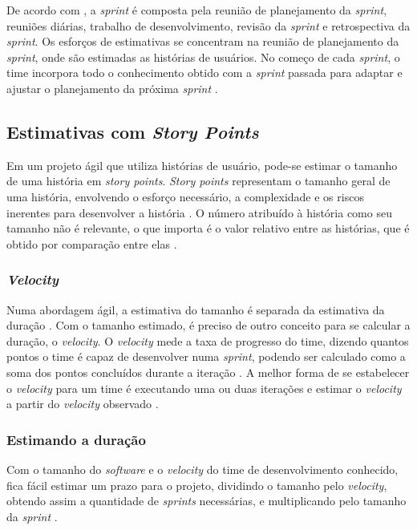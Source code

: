     De acordo com , a
    \textit{sprint} é composta pela reunião de planejamento da \textit{sprint}, reuniões diárias, trabalho de desenvolvimento,
    revisão da \textit{sprint} e retrospectiva da \textit{sprint}. Os esforços de estimativas se concentram na reunião de
    planejamento da \textit{sprint}, onde são estimadas as histórias de usuários. No começo de cada \textit{sprint}, o time
    incorpora todo o conhecimento obtido com a \textit{sprint} passada para adaptar e ajustar o planejamento da próxima
    \textit{sprint} \cite{cohn06}.

  \subsection{Estimativas com \textit{Story Points}}

    Em um projeto ágil
    que utiliza histórias de usuário, pode-se estimar o tamanho de uma história em \textit{story points}.
    \textit{Story points} representam o tamanho geral de uma história, envolvendo o esforço necessário, a complexidade e os
    riscos inerentes para desenvolver a história \cite{cohn06}. O número atribuído à história como seu tamanho não é relevante,
    o que importa é o valor relativo entre as histórias, que é obtido por comparação entre elas \cite{cohn06}.

      \subsubsection{\textit{Velocity}}

	Numa abordagem ágil, a estimativa do tamanho é separada da estimativa da duração \cite{cohn06}.
	Com o tamanho estimado, é preciso de outro conceito para se calcular a duração, o \textit{velocity}.
	O \textit{velocity} mede a taxa de progresso do time, dizendo quantos pontos o time é capaz de desenvolver
	numa \textit{sprint}, podendo ser calculado como a soma dos pontos concluídos durante a iteração \cite{cohn06}.
	A melhor forma de se estabelecer o \textit{velocity} para um time é executando uma ou duas iterações e estimar o
	\textit{velocity} a partir do \textit{velocity} observado \cite{cohn06}.

      \subsubsection{Estimando a duração}

	Com o tamanho do \textit{software} e o \textit{velocity} do time de desenvolvimento conhecido, fica fácil estimar
	um prazo para o projeto, dividindo o tamanho pelo \textit{velocity}, obtendo assim a quantidade de \textit{sprints}
	necessárias, e multiplicando pelo tamanho da \textit{sprint} \cite{cohn06}.

